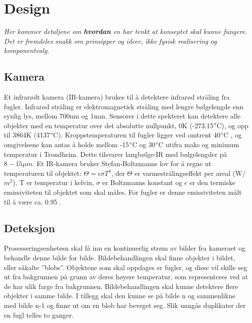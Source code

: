 \section{Design}
\label{sec:design}
\textit{Her kommer detaljene om \textbf{hvordan} en har tenkt at konseptet skal kunne fungere. Det er fremdeles snakk om prinsipper og ideer, ikke fysisk realisering og komponentvalg.}


\subsection{Kamera}

Et infrarødt kamera (IR-kamera) brukes til å detektere infrarød stråling fra fugler. Infrarød stråling er elektromagnetisk stråling med lengre bølgelengde enn synlig lys, mellom 700nm og 1mm. Sensorer i dette spekteret kan detektere alle objekter med en temperatur over det absolutte nullpunkt, 0K (-273.15$\degree$C), og opp til 3864K (4137$\degree$C). Kroppstemperaturen til fugler ligger ved omtrent 40$\degree$C \cite{fugltemp}, og omgivelsene kan antas å holde mellom -15$\degree$C og 30$\degree$C utifra maks og minimum temperatur i Trondheim. Dette tilsvarer langbølge-IR med bølgelengder på $8-15\mu m$. Et IR-kamera bruker Stefan-Boltzmanns lov for å regne ut temperaturen til objektet: $\Theta=\epsilon \sigma T^4$, der $\Theta$ er varmestrålingseffekt per areal (W/$m^2$), T er temperatur i kelvin, $\sigma$ er Boltzmanns konstant og $\epsilon$ er den termiske emissiviteten til objektet som skal måles. For fugler er denne emissiviteten målt til å være ca. 0.95 \cite{fuglemm}.


\subsection{Deteksjon}

Prosesseringsenhetesn skal få inn en kontinuerlig strøm av bilder fra kameraet og behandle denne bilde for bilde. Bildebehandlingen skal finne objekter i bildet, eller såkalte ''blobs''. Objektene som skal oppdages er fugler, og disse vil skille seg ut fra bakgrunnen på grunn av deres høyere temperatur, som representeres ved at de har ulik farge fra bakgrunnen. Bildebehandlingen skal kunne detektere flere objekter i samme bilde. I tillegg skal den kunne se på bilde n og sammenlikne med bilde n-1 og finne ut om en blob har beveget seg. Slik unngås duplikater der en fugl telles to ganger.

